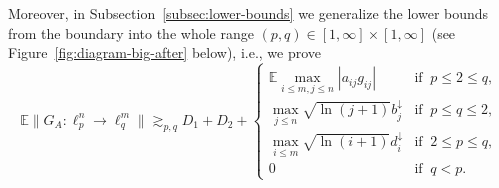 \documentclass[a4paper]{amsart}
\theoremstyle{definition}
\theoremstyle{remark}
\numberwithin{equation}{section}
\newcommand*{\EE}{\mathbb{E}}
\newcommand*{\rearr}{\downarrow} %
\begin{document}
Moreover, in Subsection~\ref{subsec:lower-bounds} we generalize the lower bounds from the boundary into the whole range $(p,q)\in [1,\infty]\times [1,\infty]$ (see Figure~\ref{fig:diagram-big-after} below), i.e., we prove
\begin{equation} \label{eq:hippo-intro-lower}
\EE \|G_A\colon \ell_{p}^n\to\ell_q^m\|
\gtrsim_{p,q} D_1+D_2 +
\begin{cases}
  \EE \max_{i \le m,j\le n} |a_{ij}g_{ij}| &  \text{if }\  p\leq 2\leq q,\\
  \max_{j\le n}\sqrt{\ln (j+1)} b_j^{\rearr{}}  &    \text{if }\ p\leq q\leq 2,\\
  \max_{i\le m}\sqrt{\ln (i+1)} d_i^{\rearr{}}&   \text{if } \ 2\leq p \leq q,\\
  0 &   \textrm{if } \ q<p.
\end{cases} 
\end{equation}




\end{document}
